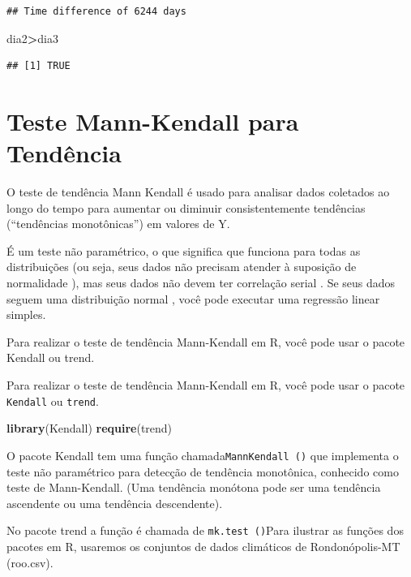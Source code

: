 \documentclass[
]{book}
\newenvironment{Shaded}{\begin{snugshade}}{\end{snugshade}}
\newcommand{\KeywordTok}[1]{\textcolor[rgb]{0.13,0.29,0.53}{\textbf{#1}}}
\newcommand{\NormalTok}[1]{#1}
\newcommand{\OperatorTok}[1]{\textcolor[rgb]{0.81,0.36,0.00}{\textbf{#1}}}
\begin{document}
\begin{verbatim}
## Time difference of 6244 days
\end{verbatim}

\begin{Shaded}
\begin{Highlighting}[]
\NormalTok{dia2}\OperatorTok{>}\NormalTok{dia3}
\end{Highlighting}
\end{Shaded}

\begin{verbatim}
## [1] TRUE
\end{verbatim}

\hypertarget{teste-mann-kendall-para-tenduxeancia}{%
\section{Teste Mann-Kendall para Tendência}\label{teste-mann-kendall-para-tenduxeancia}}

O teste de tendência Mann Kendall é usado para analisar dados coletados ao longo do tempo para aumentar ou diminuir consistentemente tendências (``tendências monotônicas'') em valores de Y.

É um teste não paramétrico, o que significa que funciona para todas as distribuições (ou seja, seus dados não precisam atender à suposição de normalidade ), mas seus dados não devem ter correlação serial . Se seus dados seguem uma distribuição normal , você pode executar uma regressão linear simples.

Para realizar o teste de tendência Mann-Kendall em R, você pode usar o pacote Kendall ou trend.

Para realizar o teste de tendência Mann-Kendall em R, você pode usar o pacote \texttt{Kendall} ou \texttt{trend}.

\begin{Shaded}
\begin{Highlighting}[]
\KeywordTok{library}\NormalTok{(Kendall)}
\KeywordTok{require}\NormalTok{(trend)}
\end{Highlighting}
\end{Shaded}

O pacote Kendall tem uma função chamada\texttt{MannKendall\ ()} que implementa o teste não paramétrico para detecção de tendência monotônica, conhecido como teste de Mann-Kendall. (Uma tendência monótona pode ser uma tendência ascendente ou uma tendência descendente).

No pacote trend a função é chamada de \texttt{mk.test\ ()}Para ilustrar as funções dos pacotes em R, usaremos os conjuntos de dados climáticos de Rondonópolis-MT (roo.csv).
\end{document}
